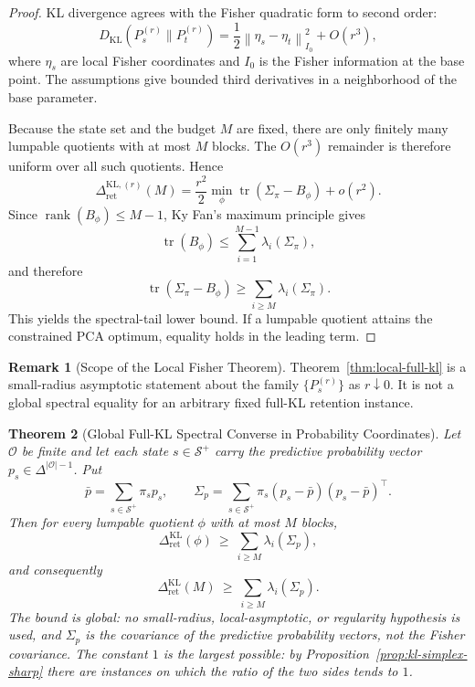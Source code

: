 \documentclass[12pt]{article}
\newtheorem{theorem}{Theorem}[section]
\theoremstyle{definition}
\newtheorem{remark}[theorem]{Remark}
\DeclareMathOperator{\rank}{rank}
\newcommand{\norm}[1]{\left\lVert#1\right\rVert}
\newcommand{\RetKL}{\Delta_{\mathrm{ret}}^{\mathrm{KL}}}
\newcommand{\Splus}{\mathcal S^{+}}
\newcommand{\RetKLr}[1]{\Delta_{\mathrm{ret}}^{\mathrm{KL},(#1)}}
\begin{document}
\begin{proof}
KL divergence agrees with the Fisher quadratic form to second order:
\[
D_{\mathrm{KL}}(P_s^{(r)}\|P_t^{(r)})
=
\frac12
\norm{\eta_s-\eta_t}_{I_0}^2
+
O(r^3),
\]
where $\eta_s$ are local Fisher coordinates and $I_0$ is the Fisher information
at the base point.  The assumptions give bounded third derivatives in a
neighborhood of the base parameter.

Because the state set and the budget $M$ are fixed, there are only finitely
many lumpable quotients with at most $M$ blocks.  The $O(r^3)$ remainder is
therefore uniform over all such quotients.  Hence
\[
\RetKLr{r}(M)
=
\frac{r^2}{2}
\min_{\phi}
\operatorname{tr}(\Sigma_\pi-B_\phi)
+
o(r^2).
\]
Since $\rank(B_\phi)\le M-1$, Ky Fan's maximum principle \cite{kyfan1951} gives
\[
\operatorname{tr}(B_\phi)
\le
\sum_{i=1}^{M-1}
\lambda_i(\Sigma_\pi),
\]
and therefore
\[
\operatorname{tr}(\Sigma_\pi-B_\phi)
\ge
\sum_{i\ge M}
\lambda_i(\Sigma_\pi).
\]
This yields the spectral-tail lower bound.  If a lumpable quotient attains the
constrained PCA optimum, equality holds in the leading term.
\end{proof}

\begin{remark}[Scope of the Local Fisher Theorem]
\label{rem:local-fisher-scope}
Theorem~\ref{thm:local-full-kl} is a small-radius asymptotic statement about
the family $\{P_s^{(r)}\}$ as $r\downarrow0$.  It is not a global spectral
equality for an arbitrary fixed full-KL retention instance.
\end{remark}

\begin{theorem}[Global Full-KL Spectral Converse in Probability Coordinates]
\label{thm:global-kl-simplex}
Let $\mathcal O$ be finite and let each state $s\in\Splus$ carry the predictive
probability vector $p_s\in\Delta^{|\mathcal O|-1}$.  Put
\[
\bar p=\sum_{s\in\Splus}\pi_sp_s,
\qquad
\Sigma_p
=
\sum_{s\in\Splus}\pi_s(p_s-\bar p)(p_s-\bar p)^{\!\top}.
\]
Then for every lumpable quotient $\phi$ with at most $M$ blocks,
\[
\RetKL(\phi)
\ \ge\
\sum_{i\ge M}\lambda_i(\Sigma_p),
\]
and consequently
\[
\RetKL(M)
\ \ge\
\sum_{i\ge M}\lambda_i(\Sigma_p).
\]
The bound is global: no small-radius, local-asymptotic, or regularity
hypothesis is used, and $\Sigma_p$ is the covariance of the predictive
\emph{probability vectors}, not the Fisher covariance.  The constant $1$ is
the largest possible: by Proposition~\ref{prop:kl-simplex-sharp} there are
instances on which the ratio of the two sides tends to $1$.
\end{theorem}
\end{document}

